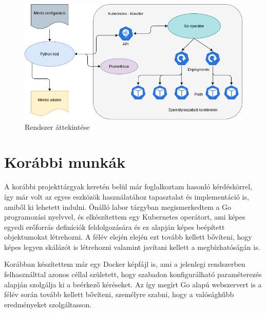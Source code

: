 \begin{figure}[!ht]
\centering
\includegraphics[width=150mm, keepaspectratio]{figures/system_overview.png}
\caption{Rendszer áttekintése}
\label{fig:system_overview}
\end{figure}

\section{Korábbi munkák}
A korábbi projekttárgyak keretén belül már foglalkoztam hasonló kérdéskörrel, így már volt az egyes eszközök használatához tapasztalat és implementáció is, amiből ki lehetett indulni. 
Önálló labor tárgyban megismerkedtem a Go programozási nyelvvel, és elkészítettem egy Kubernetes operátort, ami képes egyedi erőforrás definíciók feldolgozására és ez alapján képes beépített objektumokat létrehozni. A félév elején elején ezt tovább kellett bővíteni, hogy képes legyen skálázót is létrehozni valamint javítani kellett a megbízhatóságán is.

Korábban készítettem már egy Docker képfájl is, ami a jelenlegi rendszerben felhasználttal azonos céllal született, hogy szabadon konfigurálható paraméterezés alapján szolgálja ki a beérkező kéréseket. Az így megírt Go alapú webszervert is a félév során tovább kellett bővíteni, személyre szabni, hogy a valósághűbb eredményeket szolgáltasson.

